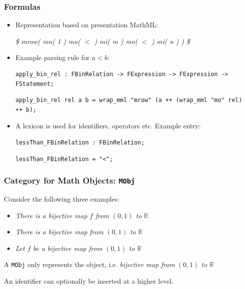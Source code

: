 \documentclass{beamer}
\begin{document}
\begin{frame}[fragile]
    \frametitle{Formulas}
    \begin{itemize}
        \item Representation based on presentation MathML:

            \emph{\$ mrow( mn( 1 ) mo( $<$ ) mi( m ) mo( $<$ ) mi( n ) ) \$}

        \item Example parsing rule for $a < b$:
    
\begin{lstlisting}[language=GF, breaklines=true]
apply_bin_rel : FBinRelation -> FExpression -> FExpression -> FStatement;
\end{lstlisting}

\begin{lstlisting}[language=GF, breaklines=true]
apply_bin_rel rel a b = wrap_mml "mrow" (a ++ (wrap_mml "mo" rel) ++ b);
\end{lstlisting}
        \item A lexicon is used for identifiers, operators etc. Example entry:

\begin{lstlisting}[language=GF, breaklines=true]
lessThan_FBinRelation : FBinRelation;
\end{lstlisting}

\begin{lstlisting}[language=GF, breaklines=true]
lessThan_FBinRelation = "<";
\end{lstlisting}
    \end{itemize}
\end{frame}

\begin{frame}[fragile]
    \frametitle{Category for Math Objects: \lstinline[language=GF]{MObj}}
    Consider the following three examples:
    \begin{itemize}
        \item \emph{There is a bijective map $f$ from $(0, 1)$ to $\mathbb{R}$}
        \item \emph{There is a bijective map from $(0, 1)$ to $\mathbb{R}$}
        \item \emph{Let $f$ be a bijective map from $(0, 1)$ to $\mathbb{R}$}
    \end{itemize}

    \vspace{1em}
    A \lstinline[language=GF]{MObj} only represents the object, i.e. \emph{bijective map from $(0, 1)$ to $\mathbb{R}$}

    An identifier can optionally be inserted at a higher level.
\end{frame}
\end{document}
